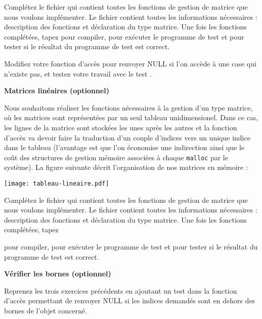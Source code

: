 \documentclass[10pt]{article}\usepackage[enonce]{exemptty}
\begin{document}
\begin{Exercice}
  \Question Complétez le fichier  qui contient toutes les
  fonctions de gestion de matrice que nous voulons implémenter. Le fichier
   contient toutes les informations nécessaires : description
  des fonctions et déclaration du type matrice. Une fois les fonctions
  complétées, tapez  pour compiler,
   pour exécuter le programme de test et  pour tester si le résultat du programme de test est correct.

  \Question Modifiez votre fonction d'accès pour renvoyer NULL si
  l'on accède à une case qui n'existe pas, et testez votre travail
  avec le test .

  
\end{Exercice}


\medskip





\begin{Exercice} \textbf{Matrices linéaires (optionnel)} 

  Nous souhaitons réaliser les fonctions nécessaires à la gestion d'un type
  matrice, où les matrices sont représentées par un seul tableau
  unidimensionel. Dans ce cas, les lignes de la matrice sont stockées les unes
  après les autres et la fonction d'accès va devoir faire la traduction d'un
  couple d'indices vers un unique indice dans le tableau (l'avantage est que
  l'on économise une indirection ainsi que le coût des structures de gestion
  mémoire associées à chaque \texttt{malloc} par le système). La figure
  suivante décrit l'organisation de nos matrices en mémoire :

  \centerline{\texttt{[image: tableau-lineaire.pdf]}}

  Complétez le fichier  qui contient toutes les
  fonctions de gestion de matrice que nous voulons implémenter. Le fichier
   contient toutes les informations nécessaires :
  description des fonctions et déclaration du type matrice. Une fois les
  fonctions complétées, tapez
  
  \noindent{} pour
  compiler,  pour exécuter le programme de
  test et  pour tester si le résultat du programme de test est
  correct.
\end{Exercice}

\begin{Exercice} \textbf{Vérifier les bornes (optionnel)}

  Reprenez les trois exercices précédents en ajoutant un test dans la fonction
  d'accès permettant de renvoyer NULL si les indices demandés sont en dehors
  des bornes de l'objet concerné.
\end{Exercice}
\end{document}
